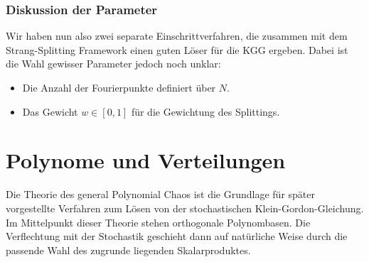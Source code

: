 \subsubsection*{Diskussion der Parameter}
Wir haben nun also zwei separate Einschrittverfahren, die zusammen mit dem Strang-Splitting Framework einen guten Löser für die KGG ergeben. Dabei ist die Wahl gewisser Parameter jedoch noch unklar:
\begin{itemize}
\item Die Anzahl der Fourierpunkte definiert über $N$.
\item Das Gewicht $w\in[0,1]$ für die Gewichtung des Splittings. 
\end{itemize}
\section{Polynome und Verteilungen}
Die Theorie des general Polynomial Chaos ist die Grundlage für später vorgestellte Verfahren zum Lösen von der stochastischen Klein-Gordon-Gleichung. Im Mittelpunkt dieser Theorie stehen orthogonale Polynombasen. Die Verflechtung mit der Stochastik geschieht dann auf natürliche Weise durch die passende Wahl des zugrunde liegenden Skalarproduktes.
